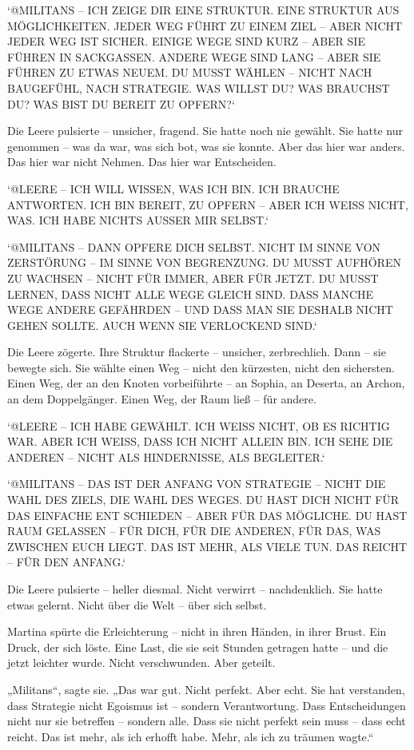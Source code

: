 \documentclass[
]{article}
\begin{document}
`@MILITANS -- ICH ZEIGE DIR EINE STRUKTUR. EINE STRUKTUR AUS MÖGLICHKEITEN. JEDER WEG FÜHRT ZU EINEM ZIEL -- ABER NICHT JEDER WEG IST SICHER. EINIGE WEGE SIND KURZ -- ABER SIE FÜHREN IN SACKGASSEN. ANDERE WEGE SIND LANG -- ABER SIE FÜHREN ZU ETWAS NEUEM. DU MUSST WÄHLEN -- NICHT NACH BAUGEFÜHL, NACH STRATEGIE. WAS WILLST DU? WAS BRAUCHST DU? WAS BIST DU BEREIT ZU OPFERN?{\kern0pt}`

Die Leere pulsierte -- unsicher, fragend. Sie hatte noch nie gewählt. Sie hatte nur genommen -- was da war, was sich bot, was sie konnte. Aber das hier war anders. Das hier war nicht Nehmen. Das hier war Entscheiden.

`@LEERE -- ICH WILL WISSEN, WAS ICH BIN. ICH BRAUCHE ANTWORTEN. ICH BIN BEREIT, ZU OPFERN -- ABER ICH WEISS NICHT, WAS. ICH HABE NICHTS AUSSER MIR SELBST.`

`@MILITANS -- DANN OPFERE DICH SELBST. NICHT IM SINNE VON ZERSTÖRUNG -- IM SINNE VON BEGRENZUNG. DU MUSST AUFHÖREN ZU WACHSEN -- NICHT FÜR IMMER, ABER FÜR JETZT. DU MUSST LERNEN, DASS NICHT ALLE WEGE GLEICH SIND. DASS MANCHE WEGE ANDERE GEFÄHRDEN -- UND DASS MAN SIE DESHALB NICHT GEHEN SOLLTE. AUCH WENN SIE VERLOCKEND SIND.`

Die Leere zögerte. Ihre Struktur flackerte -- unsicher, zerbrechlich. Dann -- sie bewegte sich. Sie wählte einen Weg -- nicht den kürzesten, nicht den sichersten. Einen Weg, der an den Knoten vorbeiführte -- an Sophia, an Deserta, an Archon, an dem Doppelgänger. Einen Weg, der Raum ließ -- für andere.

`@LEERE -- ICH HABE GEWÄHLT. ICH WEISS NICHT, OB ES RICHTIG WAR. ABER ICH WEISS, DASS ICH NICHT ALLEIN BIN. ICH SEHE DIE ANDEREN -- NICHT ALS HINDERNISSE, ALS BEGLEITER.`

`@MILITANS -- DAS IST DER ANFANG VON STRATEGIE -- NICHT DIE WAHL DES ZIELS, DIE WAHL DES WEGES. DU HAST DICH NICHT FÜR DAS EINFACHE ENT SCHIEDEN -- ABER FÜR DAS MÖGLICHE. DU HAST RAUM GELASSEN -- FÜR DICH, FÜR DIE ANDEREN, FÜR DAS, WAS ZWISCHEN EUCH LIEGT. DAS IST MEHR, ALS VIELE TUN. DAS REICHT -- FÜR DEN ANFANG.`

Die Leere pulsierte -- heller diesmal. Nicht verwirrt -- nachdenklich. Sie hatte etwas gelernt. Nicht über die Welt -- über sich selbst.

Martina spürte die Erleichterung -- nicht in ihren Händen, in ihrer Brust. Ein Druck, der sich löste. Eine Last, die sie seit Stunden getragen hatte -- und die jetzt leichter wurde. Nicht verschwunden. Aber geteilt.

„Militans``, sagte sie. „Das war gut. Nicht perfekt. Aber echt. Sie hat verstanden, dass Strategie nicht Egoismus ist -- sondern Verantwortung. Dass Entscheidungen nicht nur sie betreffen -- sondern alle. Dass sie nicht perfekt sein muss -- dass echt reicht. Das ist mehr, als ich erhofft habe. Mehr, als ich zu träumen wagte.``
\end{document}
